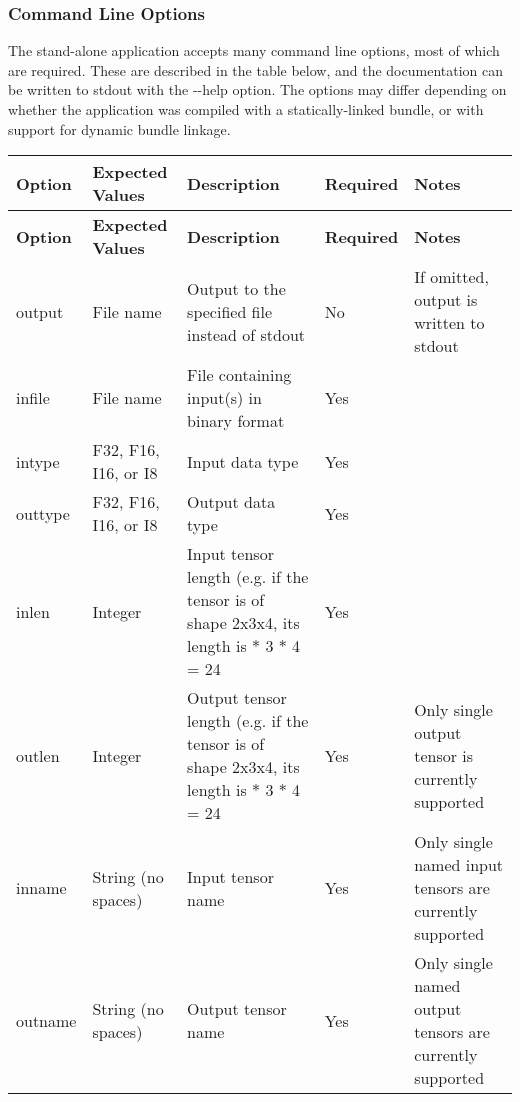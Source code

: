 \subsubsection*{Command Line Options}

The stand-\/alone application accepts many command line options, most of which are required. These are described in the table below, and the documentation can be written to {\ttfamily stdout} with the {\ttfamily -\/-\/help} option. The options may differ depending on whether the application was compiled with a statically-\/linked bundle, or with support for dynamic bundle linkage.

\tabulinesep=1mm
\begin{longtabu} spread 0pt [c]{*{5}{|X[-1]}|}
\hline
\rowcolor{\tableheadbgcolor}\textbf{ Option }&\textbf{ Expected Values }&\textbf{ Description }&\textbf{ Required }&\textbf{ Notes  }\\
\endfirsthead
\hline
\endfoot
\hline
\rowcolor{\tableheadbgcolor}\textbf{ Option }&\textbf{ Expected Values }&\textbf{ Description }&\textbf{ Required }&\textbf{ Notes  }\\
\endhead
{\ttfamily output} &File name &Output to the specified file instead of {\ttfamily stdout} &No &If omitted, output is written to {\ttfamily stdout} \\
{\ttfamily infile} &File name &File containing input(s) in binary format &Yes &\\
{\ttfamily intype} &{\ttfamily F32}, {\ttfamily F16}, {\ttfamily I16}, or {\ttfamily I8} &Input data type &Yes &\\
{\ttfamily outtype} &{\ttfamily F32}, {\ttfamily F16}, {\ttfamily I16}, or {\ttfamily I8} &Output data type &Yes &\\
{\ttfamily inlen} &Integer &Input tensor length (e.\+g. if the tensor is of shape {\ttfamily 2x3x4}, its length is { $\ast$ 3 $\ast$ 4 = 24} &Yes &\\
{\ttfamily outlen} &Integer &Output tensor length (e.\+g. if the tensor is of shape {\ttfamily 2x3x4}, its length is { $\ast$ 3 $\ast$ 4 = 24} &Yes &Only single output tensor is currently supported \\
{\ttfamily inname} &String (no spaces) &Input tensor name &Yes &Only single named input tensors are currently supported \\
{\ttfamily outname} &String (no spaces) &Output tensor name &Yes &Only single named output tensors are currently supported \\

\end{longtabu}
